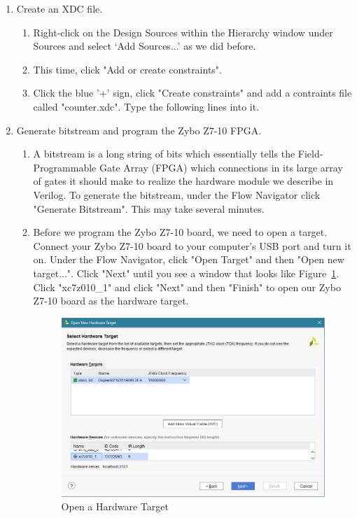 \documentclass[11pt,twoside,titlepage]{article}
\begin{document}
		
		\begin{enumerate}
			
			\item Create an XDC file.
			\begin{enumerate}
				
				\item Right-click on the Design Sources within the Hierarchy window under Sources and select `Add Sources...' as we did before.
				\item This time, click "Add or create constraints".
				\item Click the blue '+' sign, click "Create constraints" and add a contraints file called "counter.xdc". Type the following lines into it.
				
				\begin{minipage}{\linewidth}
					
				\end{minipage} 
		
			\end{enumerate}
		
			\item Generate bitstream and program the Zybo Z7-10 FPGA.
			
			\begin{enumerate}
				
				\item A bitstream is a long string of bits which essentially tells the Field-Programmable Gate Array (FPGA) which connections in its large array of gates it should make to realize the hardware module we describe in Verilog. To generate the bitstream, under the Flow Navigator click "Generate Bitstream". This may take several minutes. 
				
				\item Before we program the Zybo Z7-10 board, we need to open a target. Connect your Zybo Z7-10 board to your computer's USB port and turn it on. Under the Flow Navigator, click "Open Target" and then "Open new target...". Click "Next" until you see a window that looks like Figure~\ref{target}. Click "xc7z010\_1" and click "Next" and then "Finish" to open our Zybo Z7-10 board as the hardware target.
				
				\begin{figure}[!h]
					\centering
					\includegraphics[width=.9\textwidth]{target}
					\caption{Open a Hardware Target}
					\label{target}
				\end{figure}
				

\end{enumerate}
\end{enumerate}
\end{document}

